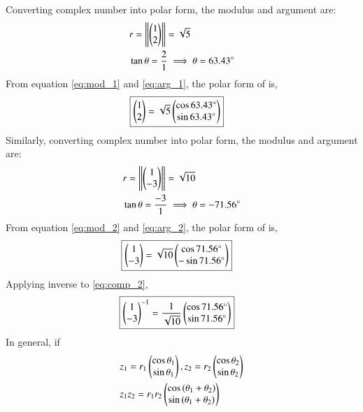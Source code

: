 \documentclass[journal,12pt,twocolumn]{IEEEtran}
\begin{document}
Converting complex number  into polar form, the modulus and argument are:\\
\begin{align}
& r = \left\lVert\begin{pmatrix}1\\ 2\end{pmatrix}\right\rVert = \sqrt{5} \label{eq:mod_1}\\
& \tan\theta = \frac{2}{1} \implies \theta = 63.43^{\circ} \label{eq:arg_1}
\end{align}
From equation \eqref{eq:mod_1} and \eqref{eq:arg_1}, the polar form of  is,\\
\begin{align}
& \boxed{\begin{pmatrix}1\\ 2\end{pmatrix} = \sqrt{5}\begin{pmatrix}\cos{63.43^{\circ}}\\ \sin{63.43^{\circ}}\end{pmatrix}} \label{eq:comp_1}
\end{align}
Similarly, converting complex number  into polar form, the modulus and argument are:\\
\begin{align}
& r = \left\lVert\begin{pmatrix}1\\ -3\end{pmatrix}\right\rVert = \sqrt{10} \label{eq:mod_2}\\
& \tan\theta = \frac{-3}{1} \implies \theta = -71.56^{\circ} \label{eq:arg_2}
\end{align}
From equation \eqref{eq:mod_2} and \eqref{eq:arg_2}, the polar form of  is,\\
\begin{align}
& \boxed{\begin{pmatrix}1\\ -3\end{pmatrix} = \sqrt{10}\begin{pmatrix}\cos{71.56^{\circ}}\\ -\sin{71.56^{\circ}}\end{pmatrix}} \label{eq:comp_2}
\end{align}
Applying inverse to \eqref{eq:comp_2},
\begin{align}
& \boxed{\begin{pmatrix}1\\ -3\end{pmatrix}^{-1} = \frac{1}{\sqrt{10}}\begin{pmatrix}\cos{71.56^{\circ}}\\ \sin{71.56^{\circ}}\end{pmatrix}} \label{eq:comp_3}
\end{align}
In general, if
\begin{align}  \label{eq:eq_1}
& z_1 = r_1\begin{pmatrix}\cos{\theta_1}\\ \sin{\theta_1}\end{pmatrix},  z_2 = r_2\begin{pmatrix}\cos{\theta_2}\\ \sin{\theta_2}\end{pmatrix} \\
&z_1z_2 = r_1r_2\begin{pmatrix}\cos{(\theta_1+\theta_2)}\\ \sin{(\theta_1+\theta_2)}\end{pmatrix} \label{eq:gen_2}
\end{align}
\end{document}
